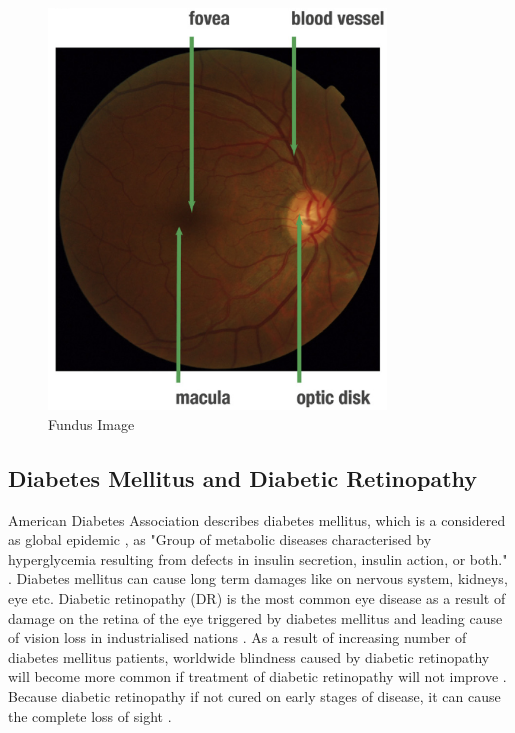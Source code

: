 \begin{figure}[t]
\centering
\includegraphics[width=0.8\textwidth]{Figures/fundus_photography_anatomical}
\caption{Fundus Image \citep{mookiah2015application}}
\label{fundusPhotoRetina}
\end{figure}


\subsection{Diabetes Mellitus and Diabetic Retinopathy}
American Diabetes Association describes diabetes mellitus, which is a considered as global epidemic \citep{falt2012modern}, as "Group of metabolic diseases characterised by hyperglycemia resulting from defects in insulin secretion, insulin action, or both." \citep{national1979classification}. Diabetes mellitus can cause long term damages like on nervous system, kidneys, eye etc. Diabetic retinopathy (DR) is the most common eye disease as a result of damage on the retina of the eye triggered by diabetes mellitus and leading cause of vision loss in industrialised nations \citep{antal2014ensemble, stitt2013advances}. As a result of increasing number of diabetes mellitus patients, worldwide blindness caused by diabetic retinopathy will become more common if treatment of diabetic retinopathy will not improve \citep{wilkinson2003proposed}. Because diabetic retinopathy if not cured on early stages of disease, it can cause the complete loss of sight \citep{rocha2011points}. 


